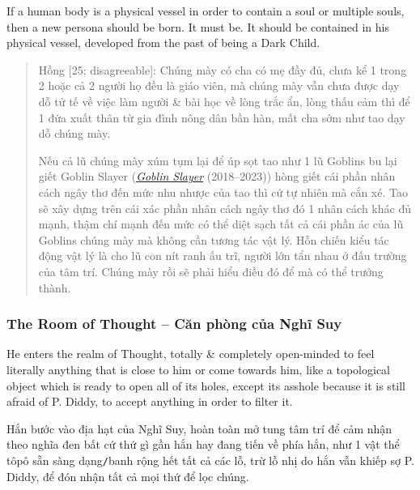 \documentclass[12pt]{article}
\begin{document}
If a human body is a physical vessel in order to contain a soul or multiple souls, then a new persona should be born. It must be. It should be contained in his physical vessel, developed from the past of being a Dark Child.
\begin{quote}
	{\sf Hồng [25; disagreeable]}: Chúng mày có cha có mẹ đầy đủ, chưa kể 1 trong 2 hoặc cả 2 người họ đều là giáo viên, mà chúng mày vẫn chưa được dạy dỗ tử tế về việc làm người \& bài học về lòng trắc ẩn, lòng thấu cảm thì để 1 đứa xuất thân từ gia đình nông dân bần hàn, mất cha sớm như tao dạy dỗ chúng mày.
	
	Nếu cả lũ chúng mày xúm tụm lại để úp sọt tao như 1 lũ Goblins bu lại giết Goblin Slayer (\href{https://www.imdb.com/title/tt8690728/}{\it Goblin Slayer} (2018--2023)) hòng giết cái phần nhân cách ngây thơ đến mức nhu nhược của tao thì cứ tự nhiên mà cắn xé. Tao sẽ xây dựng trên cái xác phần nhân cách ngây thơ đó 1 nhân cách khác đủ mạnh, thậm chí mạnh đến mức có thể diệt sạch tất cả cái phần ác của lũ Goblins chúng mày mà không cần tương tác vật lý. Hỗn chiến kiểu tác động vật lý là cho lũ con nít ranh ấu trĩ, người lớn tẩn nhau ở đấu trường của tâm trí. Chúng mày rồi sẽ phải hiểu điều đó để mà có thể trưởng thành.
\end{quote}

\subsubsection{The Room of Thought -- Căn phòng của Nghĩ Suy}
He enters the realm of Thought, totally \& completely open-minded to feel literally anything that is close to him or come towards him, like a topological object which is ready to open all of its holes, except its asshole because it is still afraid of P. Diddy, to accept anything in order to filter it.

Hắn bước vào địa hạt của Nghĩ Suy, hoàn toàn mở tung tâm trí để cảm nhận theo nghĩa đen bất cứ thứ gì gần hắn hay đang tiến về phía hắn, như 1 vật thể tôpô sẵn sàng dạng{\tt/}banh rộng hết tất cả các lỗ, trừ lỗ nhị do hắn vẫn khiếp sợ P. Diddy, để đón nhận tất cả mọi thứ để lọc chúng.
\end{document}
